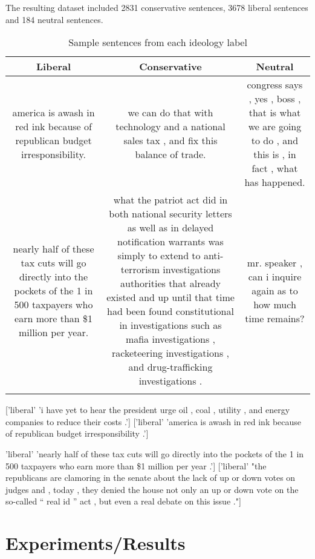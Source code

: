 \documentclass[10pt,a4paper,onecolumn]{article}
\begin{document}
The resulting dataset included 2831 conservative sentences, 3678 liberal sentences and 184 neutral sentences.

\begin{table}[h!]
	\begin{center}
		\caption{Sample sentences from each ideology label}
		\label{tab:convote-sentences}
		\begin{tabular}{c|c|c}
			\hline\hline
			\textbf{Liberal} & \textbf{Conservative} & \textbf{Neutral}\\
			\hline
			america is awash in red ink because of republican budget irresponsibility. & we can do that with technology and a national sales tax , and fix this balance of trade. & congress says , yes , boss , that is what we are going to do , and this is , in fact , what has happened. \\
			nearly half of these tax cuts will go directly into the pockets of the 1 in 500 taxpayers who earn more than \$1 million per year. & what the patriot act did in both national security letters as well as in delayed notification warrants was simply to extend to anti-terrorism investigations authorities that already existed and up until that time had been found constitutional in investigations such as mafia investigations , racketeering investigations , and drug-trafficking investigations . & mr. speaker , can i inquire again as to how much time remains?\\
			\hline\hline& 
		\end{tabular}
	\end{center}
\end{table}



['liberal'
'i have yet to hear the president urge oil , coal , utility , and energy companies to reduce their costs .']
['liberal'
'america is awash in red ink because of republican budget irresponsibility .']

'liberal'
'nearly half of these tax cuts will go directly into the pockets of the 1 in 500 taxpayers who earn more than \$1 million per year .']
['liberal'
"the republicans are clamoring in the senate about the lack of up or down votes on judges and , today , they denied the house not only an up or down vote on the so-called `` real id '' act , but even a real debate on this issue ."]

\section{Experiments/Results}
\end{document}
